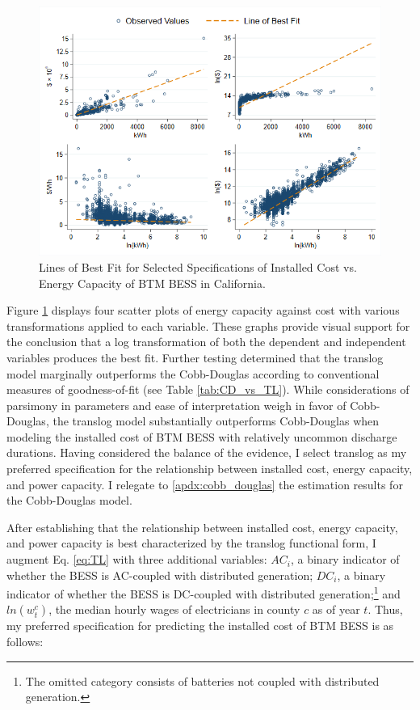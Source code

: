\documentclass[preprint,12pt,authoryear]{elsarticle}
\begin{document}
\begin{figure}[h]
\includegraphics[width=\textwidth]{graphs/CA_SGIP/LOBF_comparison.pdf}
\caption{Lines of Best Fit for Selected Specifications of Installed Cost vs. Energy Capacity of BTM BESS in California.}\label{fig:LOBF_comparison}
\end{figure}

Figure \ref{fig:LOBF_comparison} displays four scatter plots of energy capacity against cost with various transformations applied to each variable. These graphs provide visual support for the conclusion that a log transformation of both the dependent and independent variables produces the best fit. Further testing determined that the translog model marginally outperforms the Cobb-Douglas according to conventional measures of goodness-of-fit (see Table \ref{tab:CD_vs_TL}). While considerations of parsimony in parameters and ease of interpretation weigh in favor of Cobb-Douglas, the translog model substantially outperforms Cobb-Douglas when modeling the installed cost of BTM BESS with relatively uncommon discharge durations. Having considered the balance of the evidence, I select translog as my preferred specification for the relationship between installed cost, energy capacity, and power capacity. I relegate to \ref{apdx:cobb_douglas} the estimation results for the Cobb-Douglas model.

After establishing that the relationship between installed cost, energy capacity, and power capacity is best characterized by the translog functional form, I augment Eq. \ref{eq:TL} with three additional variables: $AC_i$, a binary indicator of whether the BESS is AC-coupled with distributed generation; $DC_i$, a binary indicator of whether the BESS is DC-coupled with distributed generation;\footnote{The omitted category consists of batteries not coupled with distributed generation.} and $ln(w^{c}_{t})$, the median hourly wages of electricians in county $c$ as of year $t$. Thus, my preferred specification for predicting the installed cost of BTM BESS is as follows:
\end{document}
